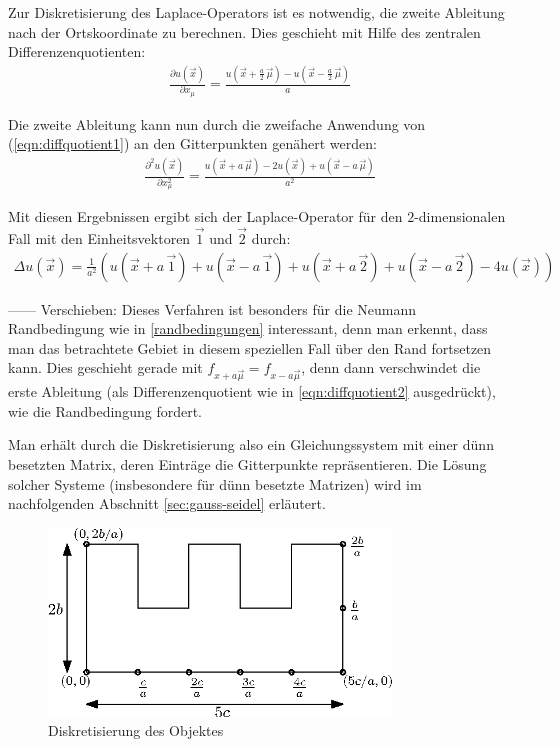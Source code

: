 \documentclass[10pt,a4paper]{article}
\begin{document}
Zur Diskretisierung des Laplace-Operators ist es notwendig, die zweite Ableitung nach der Ortskoordinate zu berechnen. Dies geschieht mit Hilfe des zentralen Differenzenquotienten:
\begin{align}
\frac{\partial u(\vec{x})}{\partial x_{\mu}}=\frac{u(\vec{x}+\frac{a}{2}\,\vec{\mu}) - u(\vec{x}-\frac{a}{2}\,\vec{\mu})}{a}
\label{eqn:diffquotient1}
\end{align}

Die zweite Ableitung kann nun durch die zweifache Anwendung von (\ref{eqn:diffquotient1}) an den Gitterpunkten genähert werden:
\begin{align}
\frac{\partial^2 u(\vec{x})}{\partial x_{\mu}^2}=\frac{u(\vec{x}+a\,\vec{\mu})-2 u(\vec{x})+u(\vec{x}-a\,\vec{\mu})}{a^2}
\label{eqn:diffquotient2}
\end{align}

Mit diesen Ergebnissen ergibt sich der Laplace-Operator für den $2$-dimensionalen Fall mit den Einheitsvektoren $\vec{1}$ und $\vec{2}$ durch:
\begin{align}
\Delta u(\vec{x})=\frac{1}{a^2}\left(u(\vec{x}+a\,\vec{1}) + u(\vec{x}-a\,\vec{1}) + u(\vec{x}+a\,\vec{2})+u(\vec{x}-a\,\vec{2}) -4 u(\vec{x})\right)
\label{eqn:diffquotient2}
\end{align}

------
Verschieben: Dieses Verfahren ist besonders für die Neumann Randbedingung wie in  \ref{randbedingungen} interessant, denn man erkennt, dass man das betrachtete Gebiet in diesem speziellen Fall über den Rand fortsetzen kann. Dies geschieht gerade mit $f_{x+a\vec{\mu}}=f_{x-a\vec{\mu}}$, denn dann verschwindet die erste Ableitung (als Differenzenquotient wie in \ref{eqn:diffquotient2} ausgedrückt), wie die Randbedingung fordert.

Man erhält durch die Diskretisierung also ein Gleichungssystem mit einer dünn besetzten Matrix, deren Einträge die Gitterpunkte repräsentieren. Die Lösung solcher Systeme (insbesondere für dünn besetzte Matrizen) wird im nachfolgenden Abschnitt \ref{sec:gauss-seidel} erläutert.

\begin{figure}[htbp!]
\centering
\includegraphics[height=5cm]{./figures/grid.eps}
\caption{Diskretisierung des Objektes}
\end{figure}
\end{document}
